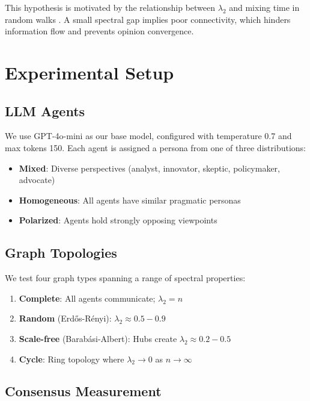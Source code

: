 \documentclass[10pt]{article}
\begin{document}
This hypothesis is motivated by the relationship between \(\lambda_2\) and mixing time in random walks \citep{lovasz1993random}. A small spectral gap implies poor connectivity, which hinders information flow and prevents opinion convergence.

\section{Experimental Setup}

\subsection{LLM Agents}

We use GPT-4o-mini as our base model, configured with temperature 0.7 and max tokens 150. Each agent is assigned a persona from one of three distributions:

\begin{itemize}
    \item \textbf{Mixed}: Diverse perspectives (analyst, innovator, skeptic, policymaker, advocate)
    \item \textbf{Homogeneous}: All agents have similar pragmatic personas
    \item \textbf{Polarized}: Agents hold strongly opposing viewpoints
\end{itemize}

\subsection{Graph Topologies}

We test four graph types spanning a range of spectral properties:

\begin{enumerate}
    \item \textbf{Complete}: All agents communicate; \(\lambda_2 = n\)
    \item \textbf{Random} (Erd\H{o}s-R\'{e}nyi): \(\lambda_2 \approx 0.5-0.9\)
    \item \textbf{Scale-free} (Barab\'{a}si-Albert): Hubs create \(\lambda_2 \approx 0.2-0.5\)
    \item \textbf{Cycle}: Ring topology where \(\lambda_2 \rightarrow 0\) as \(n \rightarrow \infty\)
\end{enumerate}

\subsection{Consensus Measurement}
\end{document}
